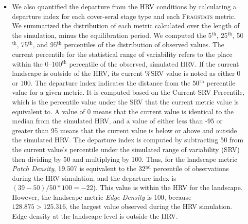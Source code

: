 \begin{itemize}
\item We also quantified the departure from the HRV conditions by calculating a departure index for each cover-seral stage type and each \textsc{Fragstats} metric. We summarized the distribution of each metric calculated over the length of the simulation, minus the equilibration period. We computed the 5$^{\text{th}}$, 25$^{\text{th}}$, 50$^{\text{th}}$, 75$^{\text{th}}$, and 95$^{\text{th}}$ percentiles of the distribution of observed values. The current percentile for the statistical range of variability refers to the place within the 0--100$^{\text{th}}$ percentile of the observed, simulated HRV. If the current landscape is outside of the HRV, its current \%SRV value is noted as either 0 or 100. The departure index indicates the distance from the 50$^{\text{th}}$ percentile value for a given metric. It is computed based on the Current SRV Percentile, which is the percentile value under the SRV that the current metric value is equivalent to. A value of 0 means that the current value is identical to the median from the simulated HRV, and a value of either less than -95 or greater than 95 means that the current value is below or above and outside the simulated HRV. The departure index is computed by subtracting 50 from the current value's percentile under the simulated range of variability (SRV) then dividing by 50 and multiplying by 100. Thus, for the landscape metric \emph{Patch Density}, 19.507 is equivalent to the 32$^{\text{nd}}$ percentile of observations during the HRV simulation, and the departure index is $(39-50)/50*100 = -22$). This value is within the HRV for the landscape. However, the landscape metric \emph{Edge Density} is 100, because $128.875 > 125.316$, the largest value observed during the HRV simulation. Edge density at the landscape level is outside the HRV.


\end{itemize}

